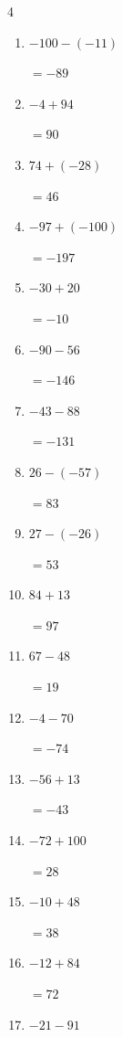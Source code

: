 \begin{multicols}{4}
\begin{enumerate}
        $=47$

  \item $-100-(-11)$

        $=-89$

  \item $-4+94$

        $=90$

  \item $74+(-28)$

        $=46$

  \item $-97+(-100)$

        $=-197$

  \item $-30+20$

        $=-10$

  \item $-90-56$

        $=-146$

  \item $-43-88$

        $=-131$

  \item $26-(-57)$

        $=83$

  \item $27-(-26)$

        $=53$

  \item $84+13$

        $=97$

  \item $67-48$

        $=19$

  \item $-4-70$

        $=-74$

  \item $-56+13$

        $=-43$

  \item $-72+100$

        $=28$

  \item $-10+48$

        $=38$

  \item $-12+84$

        $=72$

  \item $-21-91$


\end{enumerate}
\end{multicols}
